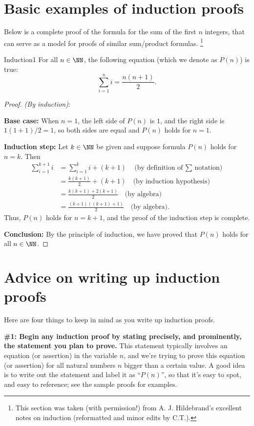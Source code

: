 

\section{ Basic examples of induction proofs}
\label{sec:Induction:BasicInduction}

Below is a complete proof of the
formula for the sum of the first $n$ integers, that can serve as a model
for proofs of similar sum/product formulas. \footnote{This section was taken (with permission!) from A. J. Hildebrand's excellent notes on induction (reformatted and minor edits  by C.T.).}

\begin{prop}{Induction1} For all $n\in\NN$, the following equation (which we denote as $P(n)$)  is true:
\[
\sum_{i=1}^n i=\frac{n(n+1)}{2}.
\tag{$P(n)$}
\]
\end{prop}
\begin{proof} \emph{(By induction)}:

\noindent
\textbf{Base case:} When $n=1$, the left side of $P(n)$ is $1$, and the
right side is $1(1+1)/2=1$, so both sides are equal and $P(n)$ holds  
for $n=1$.

\noindent
\textbf{Induction step:} Let $k\in\NN$ be given and suppose 
formula $P(n)$ holds for $n=k$. Then
\begin{align*}
\sum_{i=1}^{k+1}i&=\sum_{i=1}^k i + (k+1)\quad\text{(by 
definition of $\sum$ notation)}
\\
&=\frac{k(k+1)}{2}+(k+1)\quad \text{(by induction hypothesis)}
\\
&=\frac{k(k+1)+2(k+1)}{2}\quad \text{(by algebra)}
\\
&=\frac{(k+1)((k+1)+1)}{2}\quad \text{(by algebra)}.
\end{align*}
Thus, $P(n)$ holds for $n=k+1$, and the proof of the induction step is complete. 

\noindent
\textbf{Conclusion:} By the principle of induction, 
we have proved that $P(n)$ holds for all $n\in\NN$.  
\end{proof}


\section{Advice on writing up induction proofs}
\label{sec:Induction:Advice}
Here are four things to keep in mind as you write up induction proofs.

\noindent
 \textbf{\#1: Begin any induction proof by stating precisely, 
and prominently, the
statement  you plan to prove.} 
This statement typically involves an equation (or assertion) in the variable $n$, and we're trying to prove this equation (or assertion) for all natural numbers $n$ bigger than a certain value.  A good idea is to write out the statement and label it as ``$P(n)$'', so that it's easy to spot, and easy to reference; see the sample proofs for
examples.

